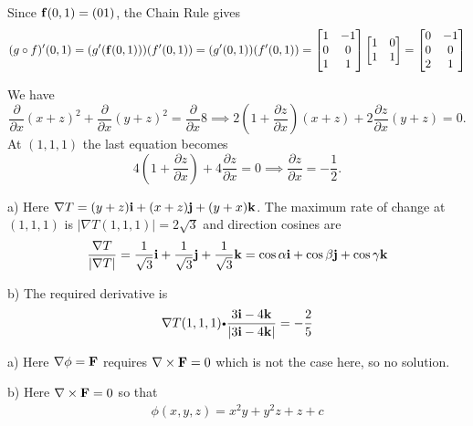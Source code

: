 \begin{Answer}{3.9}
Since $\mathbf{ f}(0,1) = \left( 0\\ 1 \right)$, the Chain Rule gives
$$(g\circ f)'(0,1) = (g'(\mathbf{ f}(0,1)))(f'(0,1)) = (g'(0,1))(f'(0,1)) =\begin{bmatrix} 1 & -1\\ 0 &
0 \\ 1 & 1 \\
\end{bmatrix}\begin{bmatrix} 1 & 0\\ 1 & 1
\end{bmatrix} = \begin{bmatrix} 0 & -1\\ 0 & 0 \\ 2 & 1 \\
\end{bmatrix}   $$

\end{Answer}
\begin{Answer}{3.13}
We have
$$  \dfrac{\partial }{\partial x}(x+z)^2+\dfrac{\partial }{\partial x}(y+z)^2= \dfrac{\partial }{\partial x}8
\implies 2(1+ \dfrac{\partial z}{\partial x})(x+z) +
2\dfrac{\partial z}{\partial x}(y+z)=0.  $$ At $(1,1,1)$ the last
equation becomes
$$ 4(1+ \dfrac{\partial z}{\partial x}) +
4\dfrac{\partial z}{\partial x}=0\implies \dfrac{\partial
z}{\partial x} = -\dfrac{1}{2}.  $$
\end{Answer}
\begin{Answer}{3.14}
a) Here $\nabla T = (y+z) \mathbf{  i} + (x+z) \mathbf{  j} + (y+x) \mathbf{  k}$.
The maximum rate of change at $(1,1,1)$ is
$|\nabla T(1,1,1)| = 2 \sqrt{3}$ and direction cosines are
\begin{eqnarray*}
\dfrac{\nabla T}{|\nabla T|} =
\dfrac{1}{\sqrt{3}} \mathbf{  i} +
\dfrac{1}{\sqrt{3}} \mathbf{  j} +
\dfrac{1}{\sqrt{3}} \mathbf{  k} =
\cos \alpha \mathbf{  i} + \cos \beta \mathbf{  j} + \cos \gamma \mathbf{  k}
\end{eqnarray*}


b) The required derivative is
\begin{eqnarray*}
\nabla T(1,1,1) \bp
\dfrac{3 \vector{ i} - 4 \vector{ k}}{|3 \vector{ i} - 4 \vector{ k}|} =
- \dfrac{2}{5}
\end{eqnarray*}

\end{Answer}
\begin{Answer}{3.15}

a) Here $\nabla \phi = \mathbf{  F}$ requires $\nabla \times \mathbf{  F} = 0$ which is
not the case here, so no solution.


b) Here $\nabla \times \mathbf{  F} = 0$ so that
\begin{eqnarray*}
\phi(x,y,z) = x^{2} y + y^{2} z + z + c
\end{eqnarray*}

\end{Answer}
